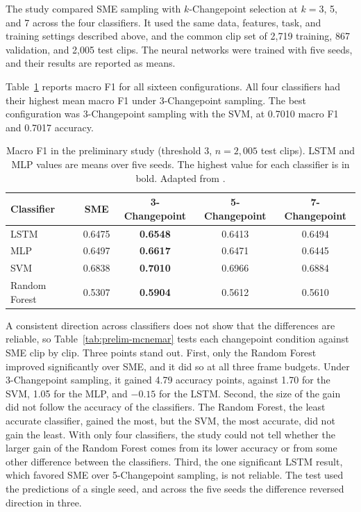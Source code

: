 The study compared SME sampling with $k$-Changepoint selection at $k = 3$, 5, and 7 across the four classifiers. It used the same data, features, task, and training settings described above, and the common clip set of 2,719 training, 867 validation, and 2,005 test clips. The neural networks were trained with five seeds, and their results are reported as means.

Table~\ref{tab:prelim-f1} reports macro F1 for all sixteen configurations. All four classifiers had their highest mean macro F1 under 3-Changepoint sampling. The best configuration was 3-Changepoint sampling with the SVM, at 0.7010 macro F1 and 0.7017 accuracy.

\begin{table}[t]
   \centering
   \caption[Macro F1 in the preliminary study]{Macro F1 in the preliminary study (threshold 3, $n = 2{,}005$ test clips). LSTM and MLP values are means over five seeds. The highest value for each classifier is in bold. Adapted from .}
   \label{tab:prelim-f1}
   \begin{tabular}{lcccc}
      \toprule
      Classifier & SME & 3-Changepoint & 5-Changepoint & 7-Changepoint \\
      \midrule
      LSTM & 0.6475 & \textbf{0.6548} & 0.6413 & 0.6494 \\
      MLP & 0.6497 & \textbf{0.6617} & 0.6471 & 0.6445 \\
      SVM & 0.6838 & \textbf{0.7010} & 0.6966 & 0.6884 \\
      Random Forest & 0.5307 & \textbf{0.5904} & 0.5612 & 0.5610 \\
      \bottomrule
   \end{tabular}
\end{table}

A consistent direction across classifiers does not show that the differences are reliable, so Table~\ref{tab:prelim-mcnemar} tests each changepoint condition against SME clip by clip. Three points stand out. First, only the Random Forest improved significantly over SME, and it did so at all three frame budgets. Under 3-Changepoint sampling, it gained 4.79 accuracy points, against 1.70 for the SVM, 1.05 for the MLP, and $-0.15$ for the LSTM. Second, the size of the gain did not follow the accuracy of the classifiers. The Random Forest, the least accurate classifier, gained the most, but the SVM, the most accurate, did not gain the least. With only four classifiers, the study could not tell whether the larger gain of the Random Forest comes from its lower accuracy or from some other difference between the classifiers. Third, the one significant LSTM result, which favored SME over 5-Changepoint sampling, is not reliable. The test used the predictions of a single seed, and across the five seeds the difference reversed direction in three.

